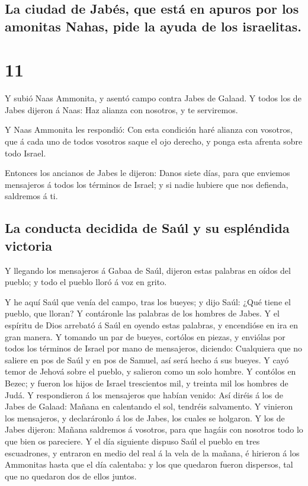 \hypertarget{la-ciudad-de-jabuxe9s-que-estuxe1-en-apuros-por-los-amonitas-nahas-pide-la-ayuda-de-los-israelitas.}{%
\subsection{La ciudad de Jabés, que está en apuros por los amonitas
Nahas, pide la ayuda de los
israelitas.}\label{la-ciudad-de-jabuxe9s-que-estuxe1-en-apuros-por-los-amonitas-nahas-pide-la-ayuda-de-los-israelitas.}}

\hypertarget{section-10}{%
\section{11}\label{section-10}}

 Y subió Naas Ammonita, y asentó campo contra Jabes de
Galaad. Y todos los de Jabes dijeron á Naas: Haz alianza con nosotros, y
te serviremos.

 Y Naas Ammonita les respondió: Con esta condición haré
alianza con vosotros, que á cada uno de todos vosotros saque el ojo
derecho, y ponga esta afrenta sobre todo Israel.

 Entonces los ancianos de Jabes le dijeron: Danos siete
días, para que enviemos mensajeros á todos los términos de Israel; y si
nadie hubiere que nos defienda, saldremos á ti.

\hypertarget{la-conducta-decidida-de-sauxfal-y-su-espluxe9ndida-victoria}{%
\subsection{La conducta decidida de Saúl y su espléndida
victoria}\label{la-conducta-decidida-de-sauxfal-y-su-espluxe9ndida-victoria}}

 Y llegando los mensajeros á Gabaa de Saúl, dijeron estas
palabras en oídos del pueblo; y todo el pueblo lloró á voz en grito.

 Y he aquí Saúl que venía del campo, tras los bueyes; y dijo
Saúl: ¿Qué tiene el pueblo, que lloran? Y contáronle las palabras de los
hombres de Jabes.  Y el espíritu de Dios arrebató á Saúl en
oyendo estas palabras, y encendióse en ira en gran manera. 
Y tomando un par de bueyes, cortólos en piezas, y enviólas por todos los
términos de Israel por mano de mensajeros, diciendo: Cualquiera que no
saliere en pos de Saúl y en pos de Samuel, así será hecho á sus bueyes.
Y cayó temor de Jehová sobre el pueblo, y salieron como un solo hombre.
 Y contólos en Bezec; y fueron los hijos de Israel
trescientos mil, y treinta mil los hombres de Judá.  Y
respondieron á los mensajeros que habían venido: Así diréis á los de
Jabes de Galaad: Mañana en calentando el sol, tendréis salvamento. Y
vinieron los mensajeros, y declaráronlo á los de Jabes, los cuales se
holgaron.  Y los de Jabes dijeron: Mañana saldremos á
vosotros, para que hagáis con nosotros todo lo que bien os pareciere.
 Y el día siguiente dispuso Saúl el pueblo en tres
escuadrones, y entraron en medio del real á la vela de la mañana, é
hirieron á los Ammonitas hasta que el día calentaba: y los que quedaron
fueron dispersos, tal que no quedaron dos de ellos juntos.

